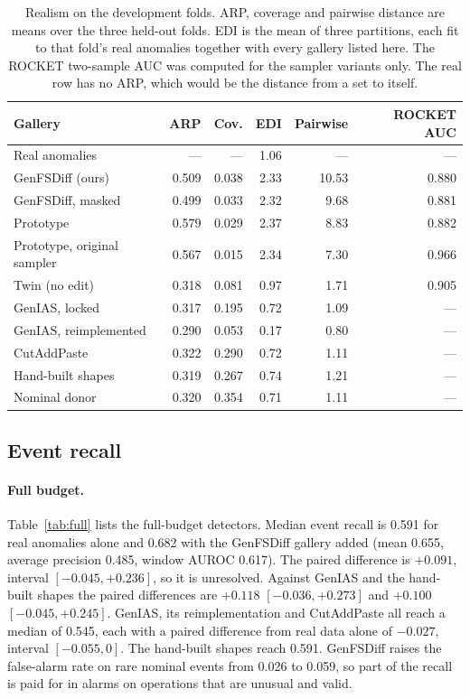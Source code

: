 \documentclass[11pt,a4paper]{article}
\begin{document}
\begin{table}[t]
\centering
\caption{Realism on the development folds. ARP, coverage and pairwise
distance are means over the three held-out folds. EDI is the mean of three
partitions, each fit to that fold's real anomalies together with every gallery
listed here. The ROCKET two-sample AUC was computed for the sampler variants
only. The real row has no ARP, which would be the distance from a set to
itself.}
\label{tab:realism}
\small
\begin{tabular}{@{}lrrrrr@{}}
\toprule
Gallery & ARP & Cov. & EDI & Pairwise & ROCKET AUC \\
\midrule
Real anomalies & --- & --- & 1.06 & --- & --- \\
\addlinespace
GenFSDiff (ours) & 0.509 & 0.038 & 2.33 & 10.53 & 0.880 \\
GenFSDiff, masked & 0.499 & 0.033 & 2.32 & 9.68 & 0.881 \\
Prototype & 0.579 & 0.029 & 2.37 & 8.83 & 0.882 \\
Prototype, original sampler & 0.567 & 0.015 & 2.34 & 7.30 & 0.966 \\
Twin (no edit) & 0.318 & 0.081 & 0.97 & 1.71 & 0.905 \\
\midrule
GenIAS, locked & 0.317 & 0.195 & 0.72 & 1.09 & --- \\
GenIAS, reimplemented & 0.290 & 0.053 & 0.17 & 0.80 & --- \\
CutAddPaste & 0.322 & 0.290 & 0.72 & 1.11 & --- \\
Hand-built shapes & 0.319 & 0.267 & 0.74 & 1.21 & --- \\
Nominal donor & 0.320 & 0.354 & 0.71 & 1.11 & --- \\
\bottomrule
\end{tabular}
\end{table}

\subsection{Event recall}
\label{sec:detect}

\paragraph{Full budget.}
Table~\ref{tab:full} lists the full-budget detectors. Median event recall is
0.591 for real anomalies alone and 0.682 with the GenFSDiff gallery added
(mean 0.655, average precision 0.485, window AUROC 0.617). The paired
difference is $+0.091$, interval $[-0.045, +0.236]$, so it is unresolved.
Against GenIAS and the hand-built shapes the paired differences are $+0.118$
$[-0.036, +0.273]$ and $+0.100$ $[-0.045, +0.245]$. GenIAS, its
reimplementation and CutAddPaste all reach a median of 0.545, each with a
paired difference from real data alone of $-0.027$, interval $[-0.055, 0]$.
The hand-built shapes reach 0.591. GenFSDiff raises the false-alarm rate on
rare nominal events from 0.026 to 0.059, so part of the recall is paid for in
alarms on operations that are unusual and valid.
\end{document}

